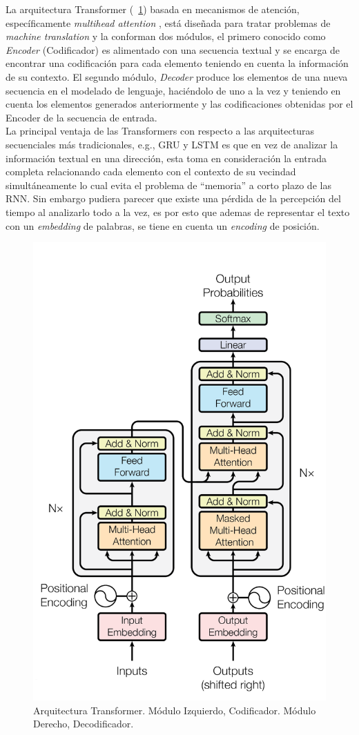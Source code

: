 	La arquitectura Transformer (\figurename~\ref{transformer}) basada en mecanismos de atención, específicamente \textit{multihead attention} \citep{vaswani2017attention}, está diseñada para tratar problemas de \textit{machine translation} y la conforman dos módulos, el primero conocido como \textit{Encoder} (Codificador) es alimentado con una secuencia textual y se encarga de encontrar una codificación para cada elemento teniendo en cuenta la información de su contexto. El segundo módulo, \textit{Decoder} produce los elementos de una nueva secuencia en el modelado de lenguaje, haciéndolo de uno a la vez y teniendo en cuenta los elementos generados anteriormente y las codificaciones obtenidas por el Encoder de la secuencia de entrada.
	\\
	La principal ventaja de las Transformers con respecto a las arquitecturas secuenciales más tradicionales, e.g., GRU y LSTM es que en vez de analizar la información textual en una dirección, esta toma en consideración la entrada completa relacionando cada elemento con el contexto de su vecindad simultáneamente lo cual evita el problema de ``memoria'' a corto plazo de las RNN.  Sin embargo pudiera parecer que existe una pérdida de la percepción del tiempo al analizarlo todo a la vez, es por esto que ademas de representar el texto con un \textit{embedding} de palabras, se tiene en cuenta un \textit{encoding} de posición. 
	\begin{figure}[!thb]
		\begin{center}
			\includegraphics[width=.5\linewidth, height=.5\textheight]{images/transformer.png}
		\end{center}
		\caption[Arquitectura Transformer]{Arquitectura Transformer. Módulo Izquierdo, Codificador. Módulo Derecho, Decodificador. \citep{vaswani2017attention} }
		\label{transformer}
	\end{figure}
